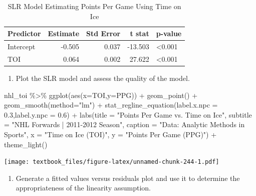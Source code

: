 \documentclass[
  11pt,
]{book}
\newenvironment{Shaded}{\begin{snugshade}}{\end{snugshade}}
\newcommand{\AttributeTok}[1]{\textcolor[rgb]{0.77,0.63,0.00}{#1}}
\newcommand{\FloatTok}[1]{\textcolor[rgb]{0.00,0.00,0.81}{#1}}
\newcommand{\FunctionTok}[1]{\textcolor[rgb]{0.00,0.00,0.00}{#1}}
\newcommand{\NormalTok}[1]{#1}
\newcommand{\SpecialCharTok}[1]{\textcolor[rgb]{0.00,0.00,0.00}{#1}}
\newcommand{\StringTok}[1]{\textcolor[rgb]{0.31,0.60,0.02}{#1}}
\providecommand{\tightlist}{%
  \setlength{\itemsep}{0pt}\setlength{\parskip}{0pt}}
\theoremstyle{definition}
\theoremstyle{definition}
\theoremstyle{definition}
\theoremstyle{definition}
\theoremstyle{remark}
\begin{document}
\begin{table}[!h]

\caption{\label{tab:unnamed-chunk-243}SLR Model Estimating Points Per Game Using Time on Ice}
\centering
\begin{tabular}[t]{lrrrl}
\toprule
Predictor & Estimate & Std Error & t stat & p-value\\
\midrule
Intercept & -0.505 & 0.037 & -13.503 & <0.001\\
TOI & 0.064 & 0.002 & 27.622 & <0.001\\
\bottomrule
\end{tabular}
\end{table}

\newpage

\begin{enumerate}
\def\labelenumi{(\alph{enumi})}
\setcounter{enumi}{2}
\tightlist
\item
  Plot the SLR model and assess the quality of the model.
\end{enumerate}

\begin{Shaded}
\begin{Highlighting}[]
\NormalTok{nhl\_toi }\SpecialCharTok{\%\textgreater{}\%} \FunctionTok{ggplot}\NormalTok{(}\FunctionTok{aes}\NormalTok{(}\AttributeTok{x=}\NormalTok{TOI,}\AttributeTok{y=}\NormalTok{PPG)) }\SpecialCharTok{+}
  \FunctionTok{geom\_point}\NormalTok{() }\SpecialCharTok{+}
  \FunctionTok{geom\_smooth}\NormalTok{(}\AttributeTok{method=}\StringTok{"lm"}\NormalTok{) }\SpecialCharTok{+} 
  \FunctionTok{stat\_regline\_equation}\NormalTok{(}\AttributeTok{label.x.npc =} \FloatTok{0.3}\NormalTok{,}\AttributeTok{label.y.npc =} \FloatTok{0.6}\NormalTok{) }\SpecialCharTok{+}
  \FunctionTok{labs}\NormalTok{(}\AttributeTok{title =} \StringTok{"Points Per Game vs. Time on Ice"}\NormalTok{,}
       \AttributeTok{subtitle =} \StringTok{"NHL Forwards | 2011{-}2012 Season"}\NormalTok{,}
       \AttributeTok{caption =} \StringTok{"Data: Analytic Methods in Sports"}\NormalTok{, }
       \AttributeTok{x =} \StringTok{"Time on Ice (TOI)"}\NormalTok{,}
       \AttributeTok{y =} \StringTok{"Points Per Game (PPG)"}\NormalTok{) }\SpecialCharTok{+}
  \FunctionTok{theme\_light}\NormalTok{()}
\end{Highlighting}
\end{Shaded}

\texttt{[image: textbook\_files/figure-latex/unnamed-chunk-244-1.pdf]}

\newpage

\begin{enumerate}
\def\labelenumi{(\alph{enumi})}
\setcounter{enumi}{3}
\tightlist
\item
  Generate a fitted values versus residuals plot and use it to determine the appropriateness of the linearity assumption.
\end{enumerate}
\end{document}

